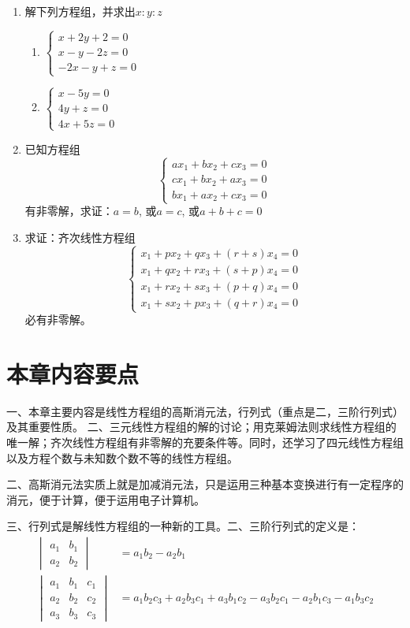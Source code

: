\begin{enumerate}
\item 解下列方程组，并求出$x:y:z$
\begin{multicols}{2}
    \begin{enumerate}
\item $\begin{cases}
    x+2y+2=0\\x-y-2z=0\\-2x-y+z=0
\end{cases}$
\item $\begin{cases}
    x-5y=0\\
4y+z=0\\
4x+5z=0
\end{cases}$
    \end{enumerate}
\end{multicols}
\item 已知方程组
\[\begin{cases}
 ax_1+bx_2+cx_3=0 \\ cx_1+bx_2+ax_3=0 \\ bx_1 +ax_2+cx_3=0   
\end{cases}\]
有非零解，求证：$a=b$, 或$a=c$, 或$a+b+c=0$

\item 求证：齐次线性方程组
\[\begin{cases}
  x_1+px_2+qx_3+ (r+s) x_4=0\\
  x_1+qx_2+rx_3+ (s+p) x_4=0\\
  x_1+rx_2+sx_3+ (p+q) x_4=0\\
  x_1+sx_2+px_3+ (q+r) x_4=0 
\end{cases}\]
必有非零解。
\end{enumerate}

\section*{本章内容要点}
一、本章主要内容是线性方程组的高斯消元法，行列式（重点是二，三阶行列式）及其重要性质。
二、三元线性方程组的解的讨论；用克莱姆法则求线性方程组的唯一解；齐次线性方程组有非零解的充要条件等。同时，还学习了四元线性方程组以及方程个数与未知数个数不等的线性方程组。

二、高斯消元法实质上就是加减消元法，只是运用三种基本变换进行有一定程序的消元，便于计算，便于运用电子计算机。

三、行列式是解线性方程组的一种新的工具。二、三阶行列式的定义是：
\[\begin{split}
\begin{vmatrix}
    a_1&b_1\\a_2&b_2
\end{vmatrix}&=a_1b_2-a_2b_1\\
\begin{vmatrix}
    a_1&b_1&c_1\\a_2&b_2&c_2\\a_3&b_3&c_3
\end{vmatrix}&=a_1b_2c_3+a_2b_3c_1+a_3b_1c_2
-a_3b_2c_1-a_2b_1c_3-a_1b_3c_2
\end{split}\]

